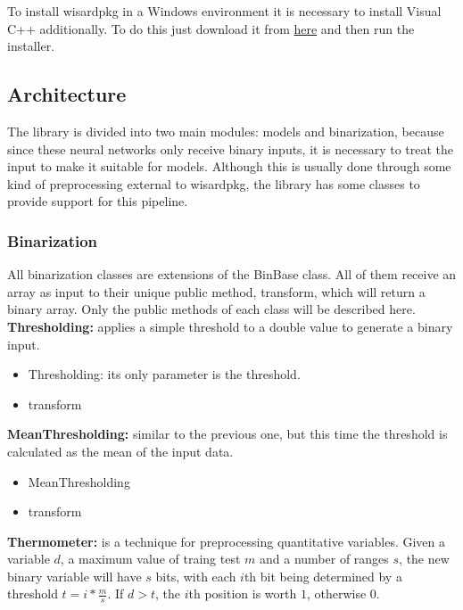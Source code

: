\documentclass[12pt]{article}
\begin{document}
To install wisardpkg in a Windows environment it is necessary to install Visual C++ additionally. To do this just download it from \hyperlink{https://support.microsoft.com/en-us/help/2977003/the-latest-supported-visual-c-downloads}{here} and then run the installer.

\subsection{Architecture}

The library is divided into two main modules: models and binarization, because since these neural networks only receive binary inputs, it is necessary to treat the input to make it suitable for models. Although this is usually done through some kind of preprocessing external to wisardpkg, the library has some classes to provide support for this pipeline.

\subsubsection{Binarization}

All binarization classes are extensions of the BinBase class. All of them receive an array as input to their unique public method, transform, which will return a binary array. Only the public methods of each class will be described here. \\

\textbf{Thresholding:} applies a simple threshold to a double value to generate a binary input.

\begin{itemize}
    \item Thresholding: its only parameter is the threshold.
    \item transform
\end{itemize}

\textbf{MeanThresholding:} similar to the previous one, but this time the threshold is calculated as the mean of the input data.

\begin{itemize}
    \item MeanThresholding
    \item transform
\end{itemize}

\textbf{Thermometer:} is a technique for preprocessing quantitative variables. Given a variable $d$, a maximum value of traing test $m$ and a number of ranges $s$, the new binary variable will have $s$ bits, with each $i$th bit being determined by a threshold $t = i * \frac{m}{s}$. If $d > t$, the $i$th position is worth $1$, otherwise $0$.
\end{document}
